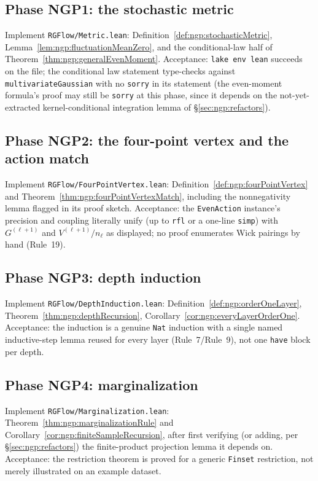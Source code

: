 \subsection*{Phase NGP1: the stochastic metric}
Implement \texttt{RGFlow/Metric.lean}: Definition~\ref{def:ngp:stochasticMetric},
Lemma~\ref{lem:ngp:fluctuationMeanZero}, and the conditional-law half of
Theorem~\ref{thm:ngp:generalEvenMoment}. Acceptance: \texttt{lake env lean} succeeds on the file;
the conditional law statement type-checks against \texttt{multivariateGaussian} with no
\texttt{sorry} in its statement (the even-moment formula's proof may still be \texttt{sorry} at
this phase, since it depends on the not-yet-extracted kernel-conditional integration lemma of
\S\ref{sec:ngp:refactors}).

\subsection*{Phase NGP2: the four-point vertex and the action match}
Implement \texttt{RGFlow/FourPointVertex.lean}: Definition~\ref{def:ngp:fourPointVertex} and
Theorem~\ref{thm:ngp:fourPointVertexMatch}, including the nonnegativity lemma flagged in its proof
sketch. Acceptance: the \texttt{EvenAction} instance's precision and coupling literally unify
(up to \texttt{rfl} or a one-line \texttt{simp}) with $G^{(\ell+1)}$ and $V^{(\ell+1)}/n_\ell$ as
displayed; no proof enumerates Wick pairings by hand (Rule~19).

\subsection*{Phase NGP3: depth induction}
Implement \texttt{RGFlow/DepthInduction.lean}: Definition~\ref{def:ngp:orderOneLayer},
Theorem~\ref{thm:ngp:depthRecursion}, Corollary~\ref{cor:ngp:everyLayerOrderOne}. Acceptance: the
induction is a genuine \texttt{Nat} induction with a single named inductive-step lemma reused for
every layer (Rule~7/Rule~9), not one \texttt{have} block per depth.

\subsection*{Phase NGP4: marginalization}
Implement \texttt{RGFlow/Marginalization.lean}: Theorem~\ref{thm:ngp:marginalizationRule} and
Corollary~\ref{cor:ngp:finiteSampleRecursion}, after first verifying (or adding, per
\S\ref{sec:ngp:refactors}) the finite-product projection lemma it depends on. Acceptance: the
restriction theorem is proved for a generic \texttt{Finset} restriction, not merely illustrated on
an example dataset.

